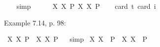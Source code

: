 \begin{isabellebody}
\isadelimproof
\ \ %
\endisadelimproof
%
\isatagproof
{}\isamarkupfalse%
\ simp%
\endisatagproof
{\isafoldproof}%
%
\isadelimproof
%
\endisadelimproof
\ \ \ \ \isanewline
{}\isamarkupfalse%
\ {\isachardoublequoteopen}{\isasymlfloor}{\isacharparenleft}{\isasymlambda}X{\isachardot}\ \isactrlbold {\isasymdiamond}\isactrlbold {\isasymexists}X{\isacharparenright}\ \isactrlbold {\isasymdown}{\isacharparenleft}P{\isacharcolon}{\isacharcolon}{\isasymup}{\isasymlangle}{\isasymup}{\isasymlangle}{\isasymzero}{\isasymrangle}{\isasymrangle}{\isacharparenright}\isactrlbold {\isasymrightarrow}\ \isactrlbold {\isasymdiamond}{\isacharparenleft}{\isacharparenleft}{\isasymlambda}X{\isachardot}\ \isactrlbold {\isasymexists}X{\isacharparenright}\ \isactrlbold {\isasymdown}P{\isacharparenright}{\isasymrfloor}{\isachardoublequoteclose}\ \isanewline
\ \ \isamarkupfalse%
{\isacharbrackleft}card\ {\isacharprime}t{\isacharequal}{}{\isacharcomma}\ card\ i{\isacharequal}{}{\isacharbrackright}%
\isadelimproof
\ %
\endisadelimproof
%
\isatagproof
{}\isamarkupfalse%
\ %
%
\endisatagproof
{\isafoldproof}%
%
\isadelimproof
%
\endisadelimproof
%
\begin{isamarkuptext}%
Example 7.14, p. 98:%
\end{isamarkuptext}\isamarkuptrue%
\isamarkupfalse%
\ {\isachardoublequoteopen}{\isasymlfloor}{\isacharparenleft}{\isasymlambda}X{\isachardot}\ \isactrlbold {\isasymdiamond}\isactrlbold {\isasymexists}X{\isacharparenright}\ \isactrlbold {\isasymdown}{\isacharparenleft}P{\isacharcolon}{\isacharcolon}{\isasymup}{\isasymlangle}{\isasymzero}{\isasymrangle}{\isacharparenright}\ \isactrlbold {\isasymrightarrow}\ {\isacharparenleft}{\isasymlambda}X{\isachardot}\ \isactrlbold {\isasymexists}X{\isacharparenright}\ \isactrlbold {\isasymdown}P{\isasymrfloor}{\isachardoublequoteclose}%
\isadelimproof
\ %
\endisadelimproof
%
\isatagproof
{}\isamarkupfalse%
\ simp%
\endisatagproof
{\isafoldproof}%
%
\isadelimproof
%
\endisadelimproof
\isanewline
{}\isamarkupfalse%
\ {\isachardoublequoteopen}{\isasymlfloor}{\isacharparenleft}{\isasymlambda}X{\isachardot}\ \isactrlbold {\isasymdiamond}\isactrlbold {\isasymexists}X{\isacharparenright}\ \ {\isacharparenleft}P{\isacharcolon}{\isacharcolon}{\isasymup}{\isasymlangle}{\isasymzero}{\isasymrangle}{\isacharparenright}\ \isactrlbold {\isasymrightarrow}\ {\isacharparenleft}{\isasymlambda}X{\isachardot}\ \isactrlbold {\isasymexists}X{\isacharparenright}\ \ P{\isasymrfloor}{\isachardoublequoteclose}\ \isanewline

\end{isabellebody}
